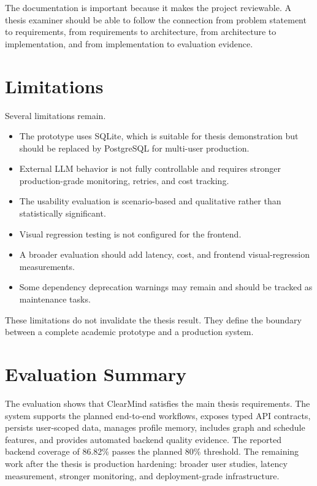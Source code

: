 The documentation is important because it makes the project reviewable. A thesis examiner should be able to follow the connection from problem statement to requirements, from requirements to architecture, from architecture to implementation, and from implementation to evaluation evidence.

\section{Limitations}

Several limitations remain.

\begin{itemize}
  \item The prototype uses SQLite, which is suitable for thesis demonstration but should be replaced by PostgreSQL for multi-user production.
  \item External LLM behavior is not fully controllable and requires stronger production-grade monitoring, retries, and cost tracking.
  \item The usability evaluation is scenario-based and qualitative rather than statistically significant.
  \item Visual regression testing is not configured for the frontend.
  \item A broader evaluation should add latency, cost, and frontend visual-regression measurements.
  \item Some dependency deprecation warnings may remain and should be tracked as maintenance tasks.
\end{itemize}

These limitations do not invalidate the thesis result. They define the boundary between a complete academic prototype and a production system.

\section{Evaluation Summary}

The evaluation shows that ClearMind satisfies the main thesis requirements. The system supports the planned end-to-end workflows, exposes typed API contracts, persists user-scoped data, manages profile memory, includes graph and schedule features, and provides automated backend quality evidence. The reported backend coverage of 86.82\% passes the planned 80\% threshold. The remaining work after the thesis is production hardening: broader user studies, latency measurement, stronger monitoring, and deployment-grade infrastructure.
